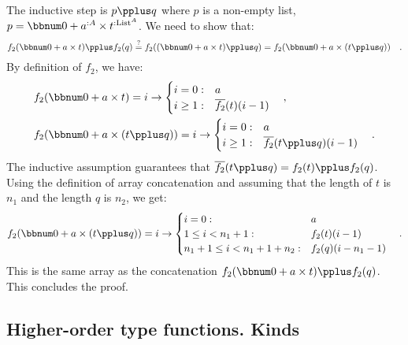 The inductive step is $p\pplus q$ where $p$ is a non-empty list,
$p=\bbnum 0+a^{:A}\times t^{:\text{List}^{A}}$. We need to show that:
\[
f_{2}(\bbnum 0+a\times t)\pplus f_{2}(q)\overset{?}{=}f_{2}((\bbnum 0+a\times t)\pplus q)=f_{2}(\bbnum 0+a\times(t\pplus q))\quad.
\]
By definition of $f_{2}$, we have:
\begin{align*}
 & f_{2}(\bbnum 0+a\times t)=i\rightarrow\begin{cases}
i=0: & a\\
i\geq1: & \overline{f_{2}}(t)(i-1)
\end{cases}\quad,\\
 & f_{2}(\bbnum 0+a\times(t\pplus q))=i\rightarrow\begin{cases}
i=0: & a\\
i\geq1: & \overline{f_{2}}(t\pplus q)(i-1)
\end{cases}\quad.
\end{align*}
The inductive assumption guarantees that $\overline{f_{2}}(t\pplus q)=f_{2}(t)\pplus f_{2}(q)$.
Using the definition of array concatenation and assuming that the
length of $t$ is $n_{1}$ and the length $q$ is $n_{2}$, we get:
\[
f_{2}(\bbnum 0+a\times(t\pplus q))=i\rightarrow\begin{cases}
i=0: & a\\
1\leq i<n_{1}+1: & f_{2}(t)(i-1)\\
n_{1}+1\leq i<n_{1}+1+n_{2}: & f_{2}(q)(i-n_{1}-1)
\end{cases}\quad.
\]
This is the same array as the concatenation $f_{2}(\bbnum 0+a\times t)\pplus f_{2}(q)$.
This concludes the proof.

\subsection{Higher-order type functions. Kinds}

